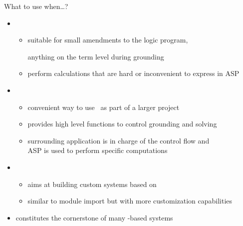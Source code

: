 \begin{frame}{What to use when\dots?}
  \begin{itemize}
  \item {}

    \begin{itemize}
    \item suitable for small amendments to the logic program,

      anything on the term level during grounding

    \item perform calculations that are hard or inconvenient to express in ASP
    \end{itemize}
    \smallskip
  \item {}

    \begin{itemize}
    \item convenient way to use \clingo\ as part of a larger project
    \item provides high level functions to control grounding and solving
    \item surrounding application is in charge of the control flow and
      \\ ASP is used to perform specific computations
    \end{itemize}
    \smallskip
  \item {}

    \begin{itemize}
    \item aims at building custom systems based on \clingo
    \item similar to module import but with more customization capabilities
    \end{itemize}

  \item [] constitutes the cornerstone of many \clingo-based systems

  \end{itemize}
\end{frame}
%
